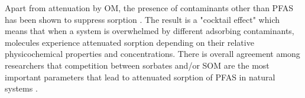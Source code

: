 Apart from attenuation by OM, the presence of contaminants other than PFAS has been shown to suppress sorption \citep{Cornelissen2006}. The result is a "cocktail effect" which means that when a system is overwhelmed by different adsorbing contaminants, molecules experience attenuated sorption depending on their relative physicochemical properties and concentrations. There is overall agreement among researchers that competition between sorbates and/or SOM are the most important parameters that lead to attenuated sorption of PFAS in natural systems \citep{zareitalabad2013perfluorooctanoic,higgins2006sorption,Teixido2013}. 